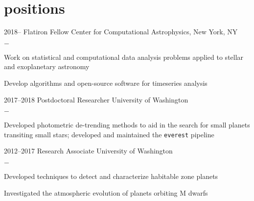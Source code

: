 \documentclass[]{luger-cv} %
\begin{document}

\section{positions}

\begin{entrylist}


    \entry
    {2018--}
    {Flatiron Fellow}
    {Center for Computational Astrophysics, New York, NY}
    {%
        \vspace{-1em}
        \begin{list}{{\color{numcolor}$-$}}{\cvlist}
            \item Work on statistical and computational data analysis problems
                  applied to stellar and exoplanetary astronomy
            \item Develop algorithms and open-source software for timeseries analysis
        \end{list}
    }


    \entry
    {2017--2018}
    {Postdoctoral Researcher}
    {University of Washington}
    {%
        \vspace{-1em}
        \begin{list}{{\color{numcolor}$-$}}{\cvlist}
            \item Developed photometric de-trending methods to aid in the search for small
                  planets transiting small stars; developed and maintained the \texttt{everest} pipeline
        \end{list}
    }


    \entry
    {2012--2017}
    {Research Associate}
    {University of Washington}
    {%
        \vspace{-1em}
        \begin{list}{{\color{numcolor}$-$}}{\cvlist}
            \item Developed techniques to detect and characterize habitable
                  zone planets
            \item Investigated the atmospheric evolution of planets orbiting M dwarfs
        \end{list}
    }


\end{entrylist}
\end{document}
